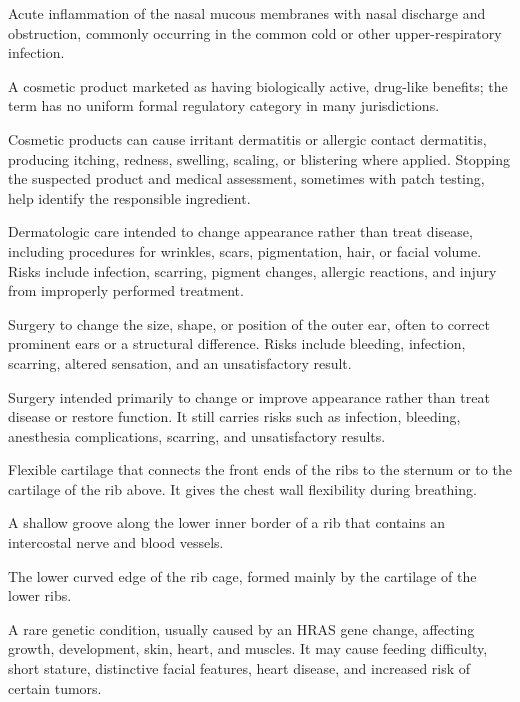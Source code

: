  Acute inflammation of the nasal mucous membranes with nasal discharge and obstruction,
commonly occurring in the common cold or other upper-respiratory infection.

 A cosmetic product marketed as having biologically active, drug-like benefits; the term has no uniform formal regulatory category in many jurisdictions.

 Cosmetic products can cause irritant dermatitis or allergic contact dermatitis, producing itching, redness, swelling, scaling, or blistering where applied. Stopping the suspected product and medical assessment, sometimes with patch testing, help identify the responsible ingredient.

 Dermatologic care intended to change appearance rather than treat disease, including procedures for wrinkles, scars, pigmentation, hair, or facial volume. Risks include infection, scarring, pigment changes, allergic reactions, and injury from improperly performed treatment.

 Surgery to change the size, shape, or position of the outer ear, often to correct prominent ears or a structural difference. Risks include bleeding, infection, scarring, altered sensation, and an unsatisfactory result.

 Surgery intended primarily to change or improve appearance rather than treat disease or restore function. It still carries risks such as infection, bleeding, anesthesia complications, scarring, and unsatisfactory results.

 Flexible cartilage that connects the front ends of the ribs to the sternum or to the cartilage of the rib above. It gives the chest wall flexibility during breathing.

 A shallow groove along the lower inner border of a rib that contains an intercostal nerve and blood vessels.

 The lower curved edge of the rib cage, formed mainly by the cartilage of the lower ribs.

 A rare genetic condition, usually caused by an HRAS gene change, affecting growth, development, skin, heart, and muscles. It may cause feeding difficulty, short stature, distinctive facial features, heart disease, and increased risk of certain tumors.

